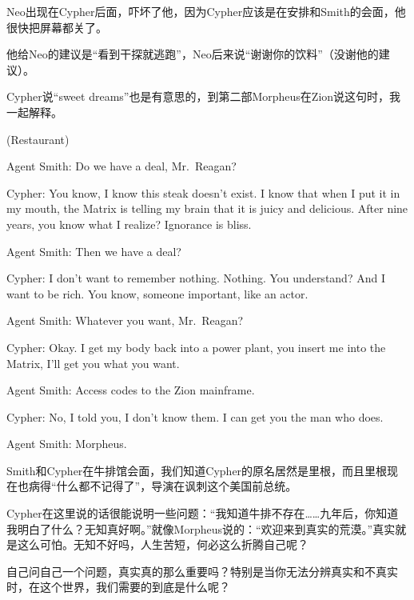 \documentclass[UTF8]{ctexart}
\newenvironment{myquote}{\color{green} \setlength{\leftskip}{6em} \setlength{\rightskip}{4em} \setlength{\parindent}{-2em}}{\par}
\begin{document}
Neo出现在Cypher后面，吓坏了他，因为Cypher应该是在安排和Smith的会面，他很快把屏幕都关了。

他给Neo的建议是“看到干探就逃跑”，Neo后来说“谢谢你的饮料”（没谢他的建议）。

Cypher说“sweet dreams”也是有意思的，到第二部Morpheus在Zion说这句时，我一起解释。

\begin{myquote}
(Restaurant)

Agent Smith: Do we have a deal, Mr.~Reagan?

Cypher: You know, I know this steak doesn't exist. I know that when I put it in my mouth, the Matrix is telling my brain that it is juicy and delicious. After nine years, you know what I realize? Ignorance is bliss.

Agent Smith: Then we have a deal?

Cypher: I don't want to remember nothing. Nothing. You understand? And I want to be rich. You know, someone important, like an actor.

Agent Smith: Whatever you want, Mr.~Reagan?

Cypher: Okay. I get my body back into a power plant, you insert me into the Matrix, I'll get you what you want.

Agent Smith: Access codes to the Zion mainframe.

Cypher: No, I told you, I don't know them. I can get you the man who does.

Agent Smith: Morpheus.
\end{myquote}

Smith和Cypher在牛排馆会面，我们知道Cypher的原名居然是里根，而且里根现在也病得“什么都不记得了”，导演在讽刺这个美国前总统。

Cypher在这里说的话很能说明一些问题：“我知道牛排不存在……九年后，你知道我明白了什么？无知真好啊。”就像Morpheus说的：“欢迎来到真实的荒漠。”真实就是这么可怕。无知不好吗，人生苦短，何必这么折腾自己呢？

自己问自己一个问题，真实真的那么重要吗？特别是当你无法分辨真实和不真实时，在这个世界，我们需要的到底是什么呢？
\end{document}
